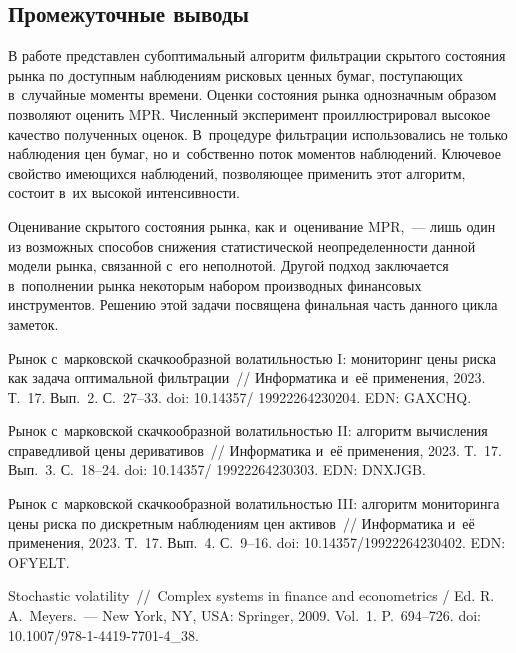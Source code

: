 \begin{multicols}{2}
\section{Промежуточные выводы}

В работе представлен субоптимальный алгоритм фильтрации скрытого состояния рынка 
по доступным наблюдениям рисковых ценных бумаг, поступающих в~случайные моменты 
времени. Оценки состояния рынка однозначным образом позволяют оценить MPR. 
Численный эксперимент проиллюстрировал высокое качество полученных оценок. 
В~процедуре фильтрации использовались не только наблюдения цен бумаг, но 
и~собственно поток моментов наблюдений. Ключевое свойство име\-ющих\-ся наблюдений, 
позволяющее применить этот алгоритм, состоит в~их высокой интенсивности.

Оценивание скрытого состояния рынка, как и~оценивание MPR,~--- лишь один из 
возможных способов снижения статистической неопределенности данной модели рынка, 
связанной с~его неполнотой. Другой подход заключается в~пополнении рынка 
некоторым набором производных финансовых инструментов. Решению этой задачи 
посвящена финальная часть данного цикла заметок.


{\small\frenchspacing
 { %
 \begin{thebibliography}{99}

 Рынок с~марковской скачкообразной волатильностью I: мониторинг 
цены риска как задача оптимальной фильтрации~// Информатика и~её 
применения, 2023. Т.~17. Вып.~2. С.~27--33. doi: 10.14357/ 19922264230204. EDN:  GAXCHQ.

 Рынок с~марковской скачкообразной волатильностью II: алгоритм 
вычисления справедливой цены деривативов~// Информатика и~её применения, 2023. 
Т.~17. Вып.~3. С.~18--24. doi: 10.14357/ 19922264230303. EDN: DNXJGB.

 Рынок с~марковской скачкообразной волатильностью III:
алгоритм мониторинга цены риска по дискретным наблюдениям цен активов~// Информатика 
и~её применения, 2023. Т.~17. Вып.~4. С.~9--16. doi: 10.14357/19922264230402. EDN: 
OFYELT.

Stochastic volatility~//~Complex systems in finance and
econometrics / Ed. R.\,A.~Meyers.~--- New York, NY, USA: Springer, 
2009.  Vol.~1. P.~694--726. doi: 10.1007/978-1-4419-7701-4\_38.


\end{thebibliography}}}
\end{multicols}
